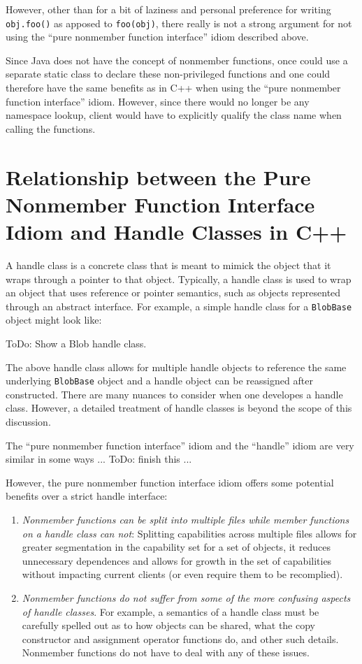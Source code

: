 \documentclass[pdf,ps2pdf,11pt]{SANDreport}
\begin{document}
However, other than for a bit of laziness and personal preference for writing
{}\texttt{obj.foo()} as apposed to {}\texttt{foo(obj)}, there really is not a
strong argument for not using the ``pure nonmember function interface'' idiom
described above.

Since Java does not have the concept of nonmember functions, once could use a
separate static class to declare these non-privileged functions and one could
therefore have the same benefits as in C++ when using the ``pure nonmember
function interface'' idiom.  However, since there would no longer be any
namespace lookup, client would have to explicitly qualify the class name when
calling the functions.

%
\section{Relationship between the Pure Nonmember Function Interface Idiom and Handle Classes in C++}
%

A handle class is a concrete class that is meant to mimick the object that it
wraps through a pointer to that object.  Typically, a handle class is used to
wrap an object that uses reference or pointer semantics, such as objects
represented through an abstract interface.  For example, a simple handle class
for a {}\texttt{BlobBase} object might look like:

ToDo: Show a Blob handle class.

The above handle class allows for multiple handle objects to reference the
same underlying {}\texttt{BlobBase} object and a handle object can be
reassigned after constructed.  There are many nuances to consider when one
developes a handle class.  However, a detailed treatment of handle classes is
beyond the scope of this discussion.

The ``pure nonmember function interface'' idiom and the ``handle'' idiom are
very similar in some ways ... ToDo: finish this ...

However, the pure nonmember function interface idiom offers some potential
benefits over a strict handle interface:

\begin{enumerate}

{}\item{}\textit{Nonmember functions can be split into multiple files while
member functions on a handle class can not}: Splitting capabilities across
multiple files allows for greater segmentation in the capability set for a set
of objects, it reduces unnecessary dependences and allows for growth in the
set of capabilities without impacting current clients (or even require them to
be recomplied).

{}\item{}\textit{Nonmember functions do not suffer from some of the more
confusing aspects of handle classes}.  For example, a semantics of a handle
class must be carefully spelled out as to how objects can be shared, what the
copy constructor and assignment operator functions do, and other such details.
Nonmember functions do not have to deal with any of these issues.

\end{enumerate}
\end{document}
